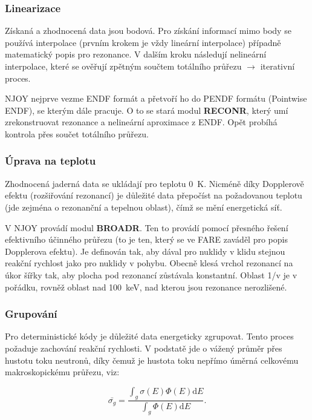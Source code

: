 \subsubsection{Linearizace}

Získaná a zhodnocená data jsou bodová. Pro získání informací mimo body se používá interpolace (prvním krokem je vždy lineární interpolace) případně matematický popis pro rezonance. V dalším kroku následují nelineární interpolace, které se ověřují zpětným součtem totálního průřezu $\rightarrow$ iterativní proces.

NJOY nejprve vezme ENDF formát a přetvoří ho do PENDF formátu (Pointwise ENDF), se kterým dále pracuje. O to se stará modul \textbf{RECONR}, který umí zrekonstruovat rezonance a nelineární aproximace z ENDF. Opět probíhá kontrola přes součet totálního průřezu.

\subsubsection{Úprava na teplotu}

Zhodnocená jaderná data se ukládají pro teplotu 0~K. Nicméně díky Dopplerově efektu (rozšiřování rezonancí) je důležité data přepočíst na požadovanou teplotu (jde zejména o rezonanční a tepelnou oblast), čímž se mění energetická síť.

V NJOY provádí modul \textbf{BROADR}. Ten to provádí pomocí přesného řešení efektivního účinného průřezu (to je ten, který se ve FARE zaváděl pro popis Dopplerova efektu). Je definován tak, aby dával pro nuklidy v klidu stejnou reakční rychlost jako pro nuklidy v pohybu. Obecně klesá vrchol rezonancí na úkor šířky tak, aby plocha pod rezonancí zůstávala konstantní. Oblast 1/v je v pořádku, rovněž oblast nad 100~keV, nad kterou jsou rezonance nerozlišené.

\subsubsection{Grupování}

Pro deterministické kódy je důležité data energeticky zgrupovat. Tento proces požaduje zachování reakční rychlosti. V podstatě jde o vážený průměr přes hustotu toku neutronů, díky čemuž je hustota toku nepřímo úměrná celkovému makroskopickému průřezu, viz:

\begin{equation}
  \boxed{
    \bar{\sigma_g} = \dfrac{\int_g \sigma(E) \Phi(E) \text{d}E}{\int_g \Phi(E) \text{d}E}.}
    \label{grupovani}
\end{equation}

